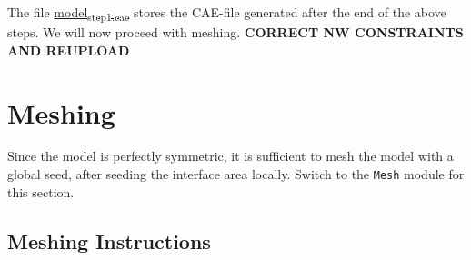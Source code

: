 \documentclass[11pt]{article}
\begin{document}
The file \href{https://github.com/Nidish96/Abaqus4Joints/blob/main/assets/assembly/model\_step1.cae}{model\textsubscript{step1.cae}} stores the CAE-file generated after the end of the above steps.
We will now proceed with meshing.
\textbf{CORRECT NW CONSTRAINTS AND REUPLOAD}
\section{Meshing}
\label{sec:orgaf0a3a3}
Since the model is perfectly symmetric, it is sufficient to mesh the model with a global seed, after seeding the interface area locally.
Switch to the \texttt{Mesh} module for this section.
\subsection{Meshing Instructions}
\label{sec:orgfc2978f}
\end{document}
